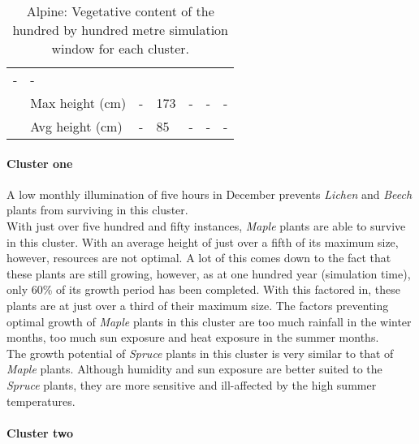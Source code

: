 \begin{table}[]
\begin{tabular}{|p{2cm}|p{2cm}|p{1.5cm}|p{1.5cm}|p{1.5cm}|p{1.5cm}|p{1.5cm}|}
						\multicolumn{1}{l|}{-} & 
						\multicolumn{1}{l|}{-} \\\cline{2-7} &
						\multicolumn{1}{l|}{Max height (cm)} & 
						\multicolumn{1}{l|}{-} &
						\multicolumn{1}{l|}{173} & 
						\multicolumn{1}{l|}{-} &
						\multicolumn{1}{l|}{-} & 
						\multicolumn{1}{l|}{-} \\\cline{2-7} &
						\multicolumn{1}{l|}{Avg height (cm)} & 
						\multicolumn{1}{l|}{-} &
						\multicolumn{1}{l|}{85} & 
						\multicolumn{1}{l|}{-} &
						\multicolumn{1}{l|}{-} & 
						\multicolumn{1}{l|}{-} \\\cline{2-7}
		\hline                                                       
		\end{tabular}
	\label{tab:results_alpine_species_cluster_properties}	
	\caption{Alpine: Vegetative content of the hundred by hundred metre simulation window for each cluster.}
\end{table}

\paragraph{Cluster one}

A low monthly illumination of five hours in December prevents \textit{Lichen} and \textit{Beech} plants from surviving in this cluster.\\
With just over five hundred and fifty instances, \textit{Maple} plants are able to survive in this cluster. With an average height of just over a fifth of its maximum size, however, resources are not optimal. A lot of this comes down to the fact that these plants are still growing, however, as at one hundred year (simulation time), only 60\% of its growth period has been completed. With this factored in, these plants are at just over a third of their maximum size. The factors preventing optimal growth of \textit{Maple} plants in this cluster are too much rainfall in the winter months, too much sun exposure and heat exposure in the summer months.\\
The growth potential of \textit{Spruce} plants in this cluster is very similar to that of \textit{Maple} plants. Although humidity and sun exposure are better suited to the \textit{Spruce} plants, they are more sensitive and ill-affected by the high summer temperatures.

\paragraph{Cluster two}

